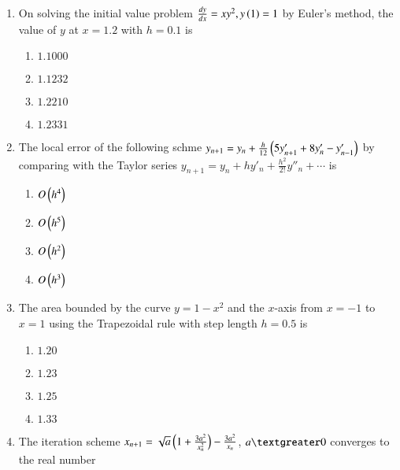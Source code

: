 \documentclass[journal]{IEEEtran}
\begin{document}
\begin{enumerate}
{\begin{multicols}{4}
\begin{enumerate}
\item $y=18-3x$
\item $y=18.1-3.1x$
\item $18.2-3.2x$
\item $18.3-3.3x$
\end{enumerate}
\end{multicols}
}
\item{
On solving the initial value problem $\frac{dy}{dx}=xy^2,y\left(1\right)=1$ by Euler's method, the value of $y$ at $x=1.2$ with $h=0.1$ is
\begin{multicols}{4}
\begin{enumerate}
\item $1.1000$
\item $1.1232$
\item $1.2210$
\item $1.2331$
\end{enumerate}
\end{multicols}
}
\item{
The local error of the following schme $y_{n+1}=y_n+\frac{h}{12}\left(5y'_{n+1} + 8y'_n - y'_{n-1}\right)$ by comparing with the Taylor series $y_{n+1} = y_n + hy'_n + \frac{h^2}{2!}y''_n + \cdots$ is 
\begin{multicols}{4}
\begin{enumerate}
\item $O\left(h^4\right)$
\item $O\left(h^5\right)$
\item $O\left(h^2\right)$
\item $O\left(h^3\right)$
\end{enumerate}
\end{multicols}
}
\item{
The area bounded by the curve $y=1-x^2$ and the $x$-axis from $x=-1$ to $x=1$ using the Trapezoidal rule with step length $h=0.5$ is
\begin{multicols}{4}
\begin{enumerate}
\item $1.20$
\item $1.23$
\item $1.25$
\item $1.33$
\end{enumerate}
\end{multicols}
}
\item{
The iteration scheme $x_{n+1}=\sqrt{a}\left(1+\frac{3a^2}{x_n^2}\right)-\frac{3a^2}{x_n}$, $a\textgreater0$ converges to the real number
\begin{multicols}{4}
\begin{enumerate}

\end{enumerate}
\end{multicols}}
\end{enumerate}
\end{document}
